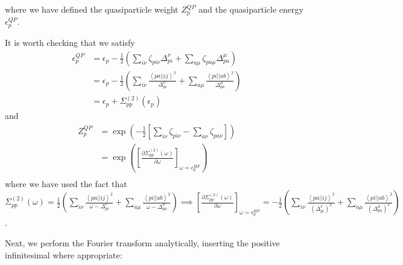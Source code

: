 where we have defined the quasiparticle weight $Z_p^{QP}$ and the quasiparticle energy $\epsilon_p^{QP}$. 
\begin{tcolorbox}
It is worth checking that we satisfy 
\begin{align}
\epsilon_p^{QP} & = \epsilon_p - \frac{1}{2} \left(\sum_{i\nu} \zeta_{pi\nu} \Delta_{pi}^\nu + \sum_{a\mu} \zeta_{pa\mu} \Delta_{pa}^\mu\right) \\
& = \epsilon_p - \frac{1}{2} \left(\sum_{i\nu} \frac{\left< pa \left| \right| ij \right>^2}{\Delta_{pi}^\nu} + \sum_{a\mu} \frac{\left< pi \left| \right| ab \right>^2}{\Delta_{pa}^\mu}\right) \\
& = \epsilon_p + \Sigma_{pp}^{(2)}( \epsilon_p)
\end{align}
and
\begin{align}
Z_p^{QP} & = \exp\left(-\frac{1}{2}\left[ \sum_{i\nu} \zeta_{pi\nu} - \sum_{a\nu} \zeta_{pa\nu}\right] \right) \\
& = \exp\left(\left[\frac{\partial \Sigma_{pp}^{(2)}(\omega)}{\partial \omega}\right]_{\omega = \epsilon_p^{HF}}\right) \\
\end{align}
where we have used the fact that $\Sigma_{pp}^{(2)}(\omega) = \frac{1}{2} \left(\sum_{i\nu} \frac{\left< pa \left| \right| ij \right>^2}{\omega - \Delta_{pi}^\nu} + \sum_{a\mu} \frac{\left< pi \left| \right| ab \right>^2}{\omega - \Delta_{pa}^\mu}\right) \implies \left[\frac{\partial \Sigma_{pp}^{(2)}(\omega)}{\partial \omega}\right]_{\omega = \epsilon_p^{HF}} = -\frac{1}{2} \left(\sum_{i\nu} \frac{\left< pa \left| \right| ij \right>^2}{\left(\Delta_{pi}^\nu\right)^2} + \sum_{a\mu} \frac{\left< pi \left| \right| ab \right>^2}{\left(\Delta_{pa}^\mu\right)^2}\right)$.
\end{tcolorbox}
Next, we perform the Fourier transform analytically, inserting the positive infinitesimal where appropriate:
